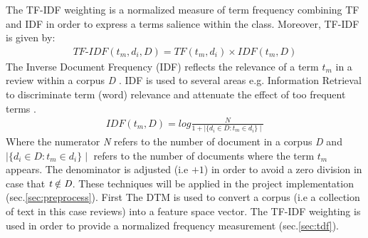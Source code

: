 \documentclass[
	a4paper,
	pdftex,
	12pt,	
	footinclude=true,
	fleqn,
	final,
	]{report}%
\begin{document}
The TF-IDF weighting is a normalized measure of term frequency 
combining TF and IDF in order to express a terms salience within 
the class. Moreover, TF-IDF is given by:
\begin{equation}
\begin{gathered}
TF\text{-}IDF(t_{m},d_{i},D) = TF(t_{m},d_{i}) \times IDF(t_{m},D) 
\end{gathered}
\end{equation}
The Inverse Document Frequency (IDF) reflects the relevance of a term 
\emph{$t_{m}$} in a review within a corpus \emph{D} \cite{Manning2008}. 
IDF is used to several areas e.g. Information Retrieval to discriminate
term (word) relevance and attenuate the effect of too frequent
terms \cite{Manning1999}.
\vspace{-0.2cm}
\begin{equation}
\begin{gathered}
IDF(t_{m}, D) = log \frac{N}{1 + \mid\{ d_{i} \in D : t_{m} \in d_{i} \}\mid}
\end{gathered}
\end{equation}
Where the numerator \emph{N} refers to the number of document in a corpus \emph{D} and 
\emph{$\mid\{d_{i} \in D : t_{m} \in d_{i} \}\mid$} refers to the number of documents where the term \emph{$t_{m}$} appears. 
The denominator is adjusted (i.e $+ 1$) in order to avoid a zero division in case that $\emph{t} \notin \emph{D}$.
These techniques will be applied in the project implementation (sec.\ref{sec:preprocess}). First 
The DTM is used to convert a corpus (i.e a collection of text 
in this case reviews) into a feature space vector. The TF-IDF weighting is 
used in order to provide a normalized frequency measurement (sec.\ref{sec:tdf}). 
% 
\end{document}
